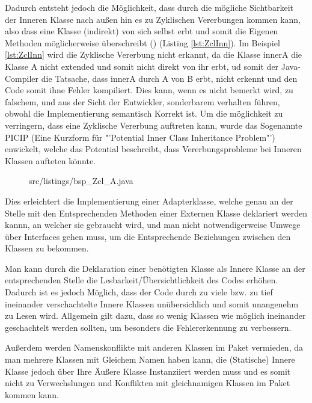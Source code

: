 Dadurch entsteht jedoch die Möglichkeit, dass durch die mögliche Sichtbarkeit der Inneren Klasse nach außen hin es zu Zyklischen Vererbungen kommen kann, also dass eine Klasse (indirekt) von sich selbst erbt und somit die Eigenen Methoden möglicherweise überschreibt (\cite{DBLP:journals/corr/abs-1301-6260}) (Listing \ref{lst:ZclInn}).
Im Beispiel \ref{lst:ZclInn}  wird die Zyklische Vererbung nicht erkannt, da die Klasse innerA die Klasse A nicht extended und somit nicht direkt von ihr erbt, ud somit der Java-Compiler die Tatsache, dass innerA durch A von B erbt, nicht erkennt und den Code somit ihne Fehler kompiliert.
Dies kann, wenn es nicht bemerkt wird, zu falschem, und aus der Sicht der Entwickler, sonderbarem verhalten führen, obwohl die Implementierung semantisch Korrekt ist.
Um die möglichkeit zu verringern, dass eine Zyklische Vererbung auftreten kann, wurde das Sogenannte PICIP (Eine Kurzform für "'Potential Inner Class Inheritance Problem"') enwickelt, welche das Potential beschreibt, dass Vererbungsprobleme bei Inneren Klassen aufteten könnte.

\begin{figure}[hbt]
\lstset{language=Java}
 {src/listings/bsp_Zcl_A.java}
\end{figure}
\newpage

Dies erleichtert die Implementierung einer Adapterklasse, welche genau an der Stelle mit den Entsprechenden Methoden einer Externen Klasse deklariert werden kannn, an welcher sie gebraucht wird, und man nicht notwendigerweise Umwege über Interfaces gehen muss, um die Entsprechende Beziehungen zwischen den Klassen zu bekommen.

Man kann durch die Deklaration einer benötigten Klasse als Innere Klasse an der entsprechenden Stelle die Lesbarkeit/Übersichtlichkeit des Codes erhöhen.
Dadurch ist es jedoch Möglich, dass der Code durch zu viele bzw. zu tief ineinander verschachtelte Innere Klassen unübersichlich und somit unangenehm zu Lesen wird. Allgemein gilt dazu, dass so wenig Klassen wie möglich ineinander geschachtelt werden sollten, um besonders die Fehlererkennung zu verbessern.

Außerdem werden Namenskonflikte mit anderen Klassen im Paket vermieden, da man mehrere Klassen mit Gleichem Namen haben kann, die (Statische) Innere Klasse jedoch über Ihre Äußere Klasse Instanziiert werden muss und es somit nicht zu Verwechslungen und Konflikten mit gleichnamigen Klassen im Paket kommen kann.

